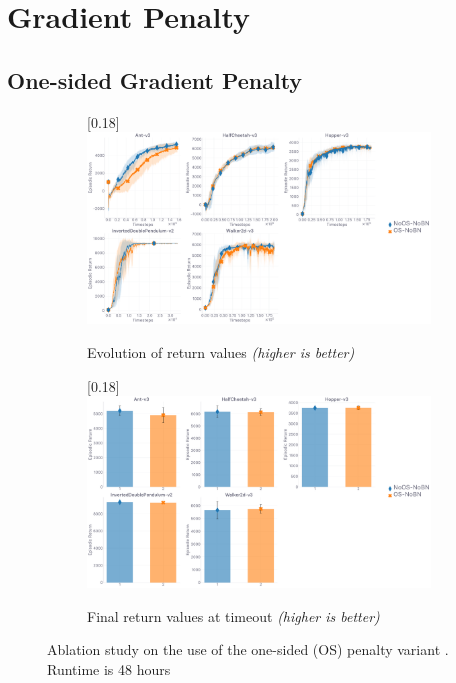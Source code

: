 \section{Gradient Penalty}

\subsection{One-sided Gradient Penalty}
\label{ablationonesided}

\begin{figure}[H]
  \center
  \begin{subfigure}[t]{0.99\textwidth}
    \center\scalebox{0.18}[0.18]{\includegraphics{Plots/fig14_os_ablation_5envs/plots_eval_env_ret_plot.pdf}}
    \caption{Evolution of return values \textit{(higher is better)}}
  \end{subfigure}
  \begin{subfigure}[t]{0.99\textwidth}
    \center\scalebox{0.18}[0.18]{\includegraphics{Plots/fig14_os_ablation_5envs/plots_eval_env_ret_barplot.pdf}}
    \caption{Final return values at timeout \textit{(higher is better)}}
  \end{subfigure}
  \caption{
  Ablation study on the use of the one-sided (OS) penalty variant \cite{Gulrajani2017-mr}.
  Runtime is 48 hours}
\end{figure}

